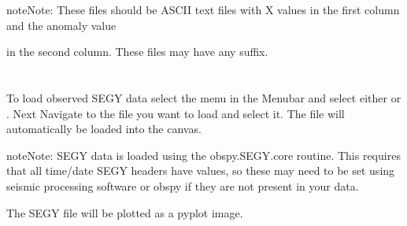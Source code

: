 \documentclass[a4paper,12pt,english]{sphinxmanual}
\begin{document}
\begin{sphinxadmonition}{note}{Note:}
These files should be ASCII text files with X values in the first column and the anomaly value
\end{sphinxadmonition}

in the second column. These files may have any suffix.


\section{}
\label{\detokenize{manual__segy:segy-data}}\label{\detokenize{manual__segy::doc}}

\subsection{}
\label{\detokenize{manual__segy:loading-segy-data}}
To load observed SEGY data select the  menu in the Menubar and select either
 or .
Next Navigate to the file you want to load and select it.
The file will automatically be loaded into the canvas.

\begin{sphinxadmonition}{note}{Note:}
SEGY data is loaded using the obspy.SEGY.core routine. This requires that all time/date SEGY headers have values,
so these may need to be set using seismic processing software or obspy if they are not present in your data.

The SEGY file will be plotted as a pyplot image.
\end{sphinxadmonition}


\section{}
\label{\detokenize{manual__geology:geologic-data}}\label{\detokenize{manual__geology::doc}}

\subsection{}
\label{\detokenize{manual__geology:loading-geologic-data}}

\section{}
\label{\detokenize{manual__export_figure:export-figure}}\label{\detokenize{manual__export_figure::doc}}
\end{document}
